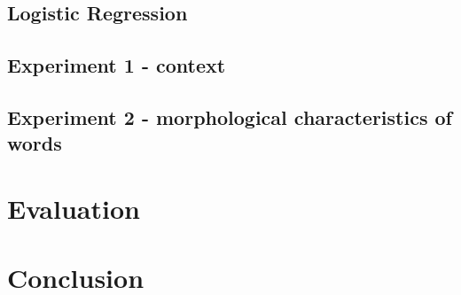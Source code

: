\documentclass[letterpaper]{article}
\begin{document}
\subsection{Logistic Regression}

\subsection{Experiment 1 - context}

\subsection{Experiment 2 - morphological characteristics of words}

\section{Evaluation}

\section{Conclusion}
\end{document}

